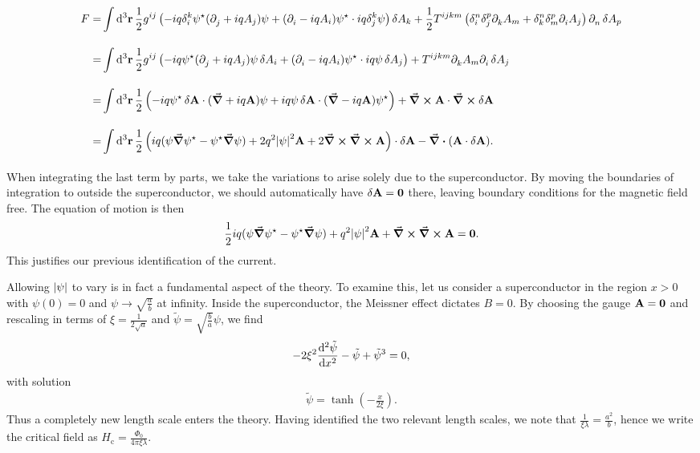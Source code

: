 \begin{align*}
	F =& \inte{}{}\dd[3]{\vb{r}}\frac{1}{2}g^{ij}\left(-iq\kdelta{k}{i}\psi\cc(\del{}{j} + iqA_{j})\psi + (\del{}{i} - iqA_{i})\psi\cc\cdot iq\kdelta{k}{j}\psi\right)\var{A_{k}} + \frac{1}{2}T^{ijkm}\left(\kdelta{n}{i}\kdelta{p}{j}\del{}{k}A_{m} + \kdelta{n}{k}\kdelta{p}{m}\del{}{i}A_{j}\right)\del{}{n}\var{A_{p}} \\
	  =& \inte{}{}\dd[3]{\vb{r}}\frac{1}{2}g^{ij}\left(-iq\psi\cc(\del{}{j} + iqA_{j})\psi\var{A_{i}} + (\del{}{i} - iqA_{i})\psi\cc\cdot iq\psi\var{A_{j}}\right) + T^{ijkm}\del{}{k}A_{m}\del{}{i}\var{A_{j}} \\
	  =& \inte{}{}\dd[3]{\vb{r}}\frac{1}{2}\left(-iq\psi\cc\var{\vb{A}}\cdot(\grad{} + iq\vb{A})\psi + iq\psi\var{\vb{A}}\cdot(\grad{} - iq\vb{A})\psi\cc\right) + \curl{\vb{A}}\cdot\curl{\var{\vb{A}}} \\
	  =& \inte{}{}\dd[3]{\vb{r}}\frac{1}{2}\left(iq(\psi\grad{\psi\cc} - \psi\cc\grad{\psi}) + 2q^{2}\abs{\psi}^{2}\vb{A} + 2\curl{\curl{\vb{A}}}\right)\cdot\var{\vb{A}} - \div(\vb{A}\cdot\var{\vb{A}}).
\end{align*}
When integrating the last term by parts, we take the variations to arise solely due to the superconductor. By moving the boundaries of integration to outside the superconductor, we should automatically have $\var{\vb{A}} = \vb{0}$ there, leaving boundary conditions for the magnetic field free. The equation of motion is then
\begin{align*}
	\frac{1}{2}iq(\psi\grad{\psi\ensuremath{^{\star}}} - \psi^{\star}\grad{\psi}) + q^{2}\abs{\psi}^{2}\vb{A} + \curl{\curl{\vb{A}}} = \vb{0}.
\end{align*}
This justifies our previous identification of the current.

Allowing $\abs{\psi}$ to vary is in fact a fundamental aspect of the theory. To examine this, let us consider a superconductor in the region $x > 0$ with $\psi(0) = 0$ and $\psi\to\sqrt{\frac{a}{b}}$ at infinity. Inside the superconductor, the Meissner effect dictates $B = 0$. By choosing the gauge $\vb{A} = \vb{0}$ and rescaling in terms of $\xi = \frac{1}{2\sqrt{a}}$ and $\tilde{\psi} = \sqrt{\frac{b}{a}}\psi$, we find
\begin{align*}
	-2\xi^{2}\dv[2]{\tilde{\psi}}{x} - \tilde{\psi} + \tilde{\psi}^{3} = 0,
\end{align*}
with solution
\begin{align*}
	\tilde{\psi} = \tanh(-\frac{x}{2\xi}).
\end{align*}
Thus a completely new length scale enters the theory. Having identified the two relevant length scales, we note that $\frac{1}{\xi\lambda} = \frac{a^{2}}{b}$, hence we write the critical field as $H_{\text{c}} = \frac{\Phi_{0}}{4\pi\xi\lambda}$.

